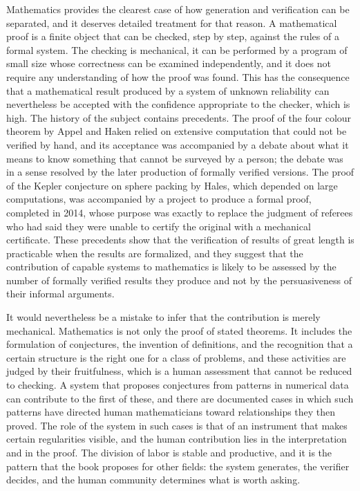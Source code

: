 Mathematics provides the clearest case of how generation and verification can be separated, and it deserves detailed treatment for that reason. A mathematical proof is a finite object that can be checked, step by step, against the rules of a formal system. The checking is mechanical, it can be performed by a program of small size whose correctness can be examined independently, and it does not require any understanding of how the proof was found. This has the consequence that a mathematical result produced by a system of unknown reliability can nevertheless be accepted with the confidence appropriate to the checker, which is high. The history of the subject contains precedents. The proof of the four colour theorem by Appel and Haken relied on extensive computation that could not be verified by hand, and its acceptance was accompanied by a debate about what it means to know something that cannot be surveyed by a person; the debate was in a sense resolved by the later production of formally verified versions. The proof of the Kepler conjecture on sphere packing by Hales, which depended on large computations, was accompanied by a project to produce a formal proof, completed in 2014, whose purpose was exactly to replace the judgment of referees who had said they were unable to certify the original with a mechanical certificate. These precedents show that the verification of results of great length is practicable when the results are formalized, and they suggest that the contribution of capable systems to mathematics is likely to be assessed by the number of formally verified results they produce and not by the persuasiveness of their informal arguments.

It would nevertheless be a mistake to infer that the contribution is merely mechanical. Mathematics is not only the proof of stated theorems. It includes the formulation of conjectures, the invention of definitions, and the recognition that a certain structure is the right one for a class of problems, and these activities are judged by their fruitfulness, which is a human assessment that cannot be reduced to checking. A system that proposes conjectures from patterns in numerical data can contribute to the first of these, and there are documented cases in which such patterns have directed human mathematicians toward relationships they then proved. The role of the system in such cases is that of an instrument that makes certain regularities visible, and the human contribution lies in the interpretation and in the proof. The division of labor is stable and productive, and it is the pattern that the book proposes for other fields: the system generates, the verifier decides, and the human community determines what is worth asking.

